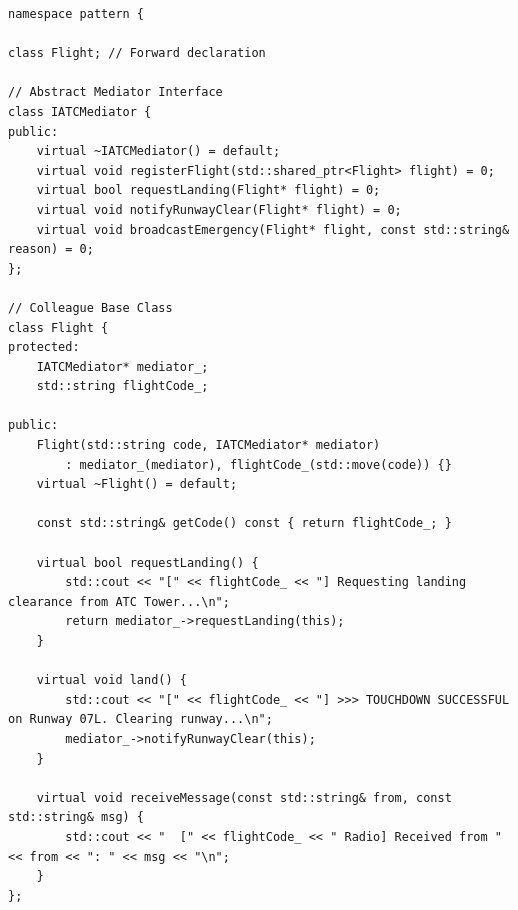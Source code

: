\documentclass[12pt,a4paper]{article}
\begin{document}
\begin{lstlisting}[caption={Mediator Interface and Flight Colleague Base Class}]
namespace pattern {

class Flight; // Forward declaration

// Abstract Mediator Interface
class IATCMediator {
public:
    virtual ~IATCMediator() = default;
    virtual void registerFlight(std::shared_ptr<Flight> flight) = 0;
    virtual bool requestLanding(Flight* flight) = 0;
    virtual void notifyRunwayClear(Flight* flight) = 0;
    virtual void broadcastEmergency(Flight* flight, const std::string& reason) = 0;
};

// Colleague Base Class
class Flight {
protected:
    IATCMediator* mediator_;
    std::string flightCode_;

public:
    Flight(std::string code, IATCMediator* mediator)
        : mediator_(mediator), flightCode_(std::move(code)) {}
    virtual ~Flight() = default;

    const std::string& getCode() const { return flightCode_; }

    virtual bool requestLanding() {
        std::cout << "[" << flightCode_ << "] Requesting landing clearance from ATC Tower...\n";
        return mediator_->requestLanding(this);
    }

    virtual void land() {
        std::cout << "[" << flightCode_ << "] >>> TOUCHDOWN SUCCESSFUL on Runway 07L. Clearing runway...\n";
        mediator_->notifyRunwayClear(this);
    }

    virtual void receiveMessage(const std::string& from, const std::string& msg) {
        std::cout << "  [" << flightCode_ << " Radio] Received from " << from << ": " << msg << "\n";
    }
};
\end{lstlisting}
\end{document}
